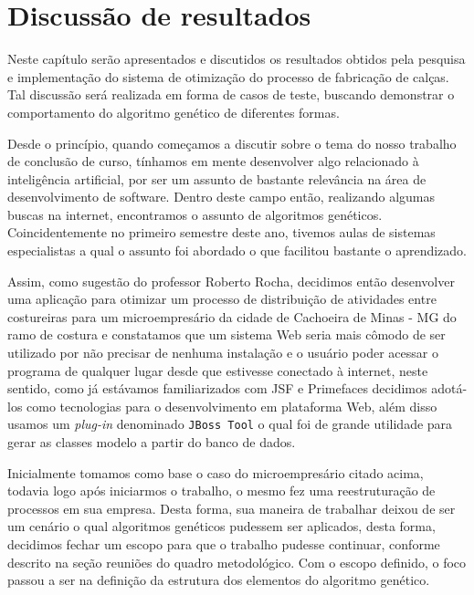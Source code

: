 \chapter{Discussão de resultados}

\par Neste capítulo serão apresentados e discutidos os resultados obtidos pela pesquisa e implementação 
do sistema de otimização do processo de fabricação de calças. Tal discussão será realizada em forma de
casos de teste, buscando demonstrar o comportamento do algoritmo genético de diferentes formas.

\par Desde o princípio, quando começamos a discutir sobre o tema do nosso trabalho de conclusão de curso, tínhamos em mente
desenvolver algo relacionado à inteligência artificial, por ser um assunto de bastante relevância na área de desenvolvimento
de software. Dentro deste campo então, realizando algumas buscas na internet, encontramos o assunto de algoritmos genéticos.
Coincidentemente no primeiro semestre deste ano, tivemos aulas de sistemas especialistas a qual o assunto foi abordado o que facilitou bastante o aprendizado. 

\par Assim, como sugestão do professor Roberto Rocha, decidimos então desenvolver uma aplicação para otimizar um processo de
distribuição de atividades entre costureiras para um microempresário da cidade de Cachoeira de Minas - MG do ramo de costura e 
constatamos que um sistema Web seria mais cômodo de ser utilizado por não precisar de nenhuma instalação e o usuário poder
acessar o programa de qualquer lugar desde que estivesse conectado à internet, neste sentido, como já estávamos familiarizados
com JSF e Primefaces decidimos adotá-los como tecnologias para o desenvolvimento em plataforma Web, além disso usamos um 
\textit{plug-in} denominado \texttt{JBoss Tool} o qual foi de grande utilidade para gerar as classes modelo a partir do 
banco de dados.

\par Inicialmente tomamos como base o caso do microempresário citado acima, todavia logo após iniciarmos o trabalho, o mesmo fez uma 
reestruturação de processos em sua empresa. Desta forma, sua maneira de trabalhar deixou de ser um cenário o qual algoritmos genéticos
pudessem ser aplicados, desta forma, decidimos fechar um escopo para que o trabalho pudesse continuar, conforme descrito na seção 
reuniões do quadro metodológico. Com o escopo definido, o foco passou a ser na definição da estrutura dos elementos do algoritmo genético. 

